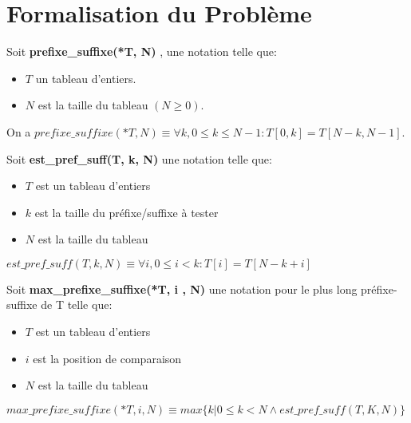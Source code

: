 \section{Formalisation du Problème}\label{formalisation}

Soit \textbf{prefixe\_suffixe(*T, N)} , une notation telle que:
\begin{itemize}
   \item $T$ un tableau d'entiers.
   \item $N$ est la taille du tableau $(N \geq 0)$.
\end{itemize}

\vspace{0.2cm}
On a $prefixe\_suffixe (*T, N) \equiv \forall k, 0 \leq k \leq N-1 : T[0, k] = T[N-k, N-1]$.

\vspace{0.4cm}
Soit \textbf{est\_pref\_suff(T, k, N)} une notation telle que:
\begin{itemize}
   \item $T$ est un tableau d'entiers
   \item $k$ est la taille du préfixe/suffixe à tester
   \item $N$ est la taille du tableau
\end{itemize}

\vspace{0.2cm}
$est\_pref\_suff(T, k, N) \equiv \forall i, 0 \leq i < k : T[i] = T[N-k+i]$

\vspace{0.4cm}
Soit \textbf{max\_prefixe\_suffixe(*T, i , N)} une notation pour le plus long 
préfixe-suffixe de T telle que:
\begin{itemize}
   \item $T$ est un tableau d'entiers
   \item $i$ est la position de comparaison
   \item $N$ est la taille du tableau
\end{itemize}

\vspace{0.2cm}
$max\_prefixe\_suffixe(*T, i , N) \equiv max\{k | 0 \leq k < N \wedge est\_pref\_suff(T, K, N)\}$

